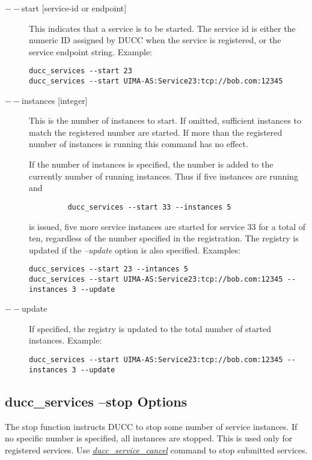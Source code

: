        \begin{description}
       \item[$--$start {[service-id or endpoint]}] This indicates that a service is to be started. The service id
         is either the numeric ID assigned by DUCC when the service is registered, or the service
         endpoint string.  Example:
\begin{verbatim}
ducc_services --start 23 
ducc_services --start UIMA-AS:Service23:tcp://bob.com:12345 
\end{verbatim}
         
       \item[$--$instances {[integer]}] This is the number of instances to start. If omitted, sufficient
         instances to match the registered number are started. If more than the registered number of
         instances is running this command has no effect.

         If the number of instances is specified, the number is added
         to the currently number of running instances. Thus if five instances are running and
\begin{verbatim}
         ducc_services --start 33 --instances 5
\end{verbatim}
         is issued, five more service instances are started for service 33 for a total of ten,
         regardless of the number specified in the registration. The registry is updated if the
         {\em --update} option is also specified. Examples:
\begin{verbatim}
ducc_services --start 23 --intances 5 
ducc_services --start UIMA-AS:Service23:tcp://bob.com:12345 --instances 3 --update 
\end{verbatim}

       \item[$--$update]If specified, the registry is updated to the total number of started
         instances.  Example:
\begin{verbatim}
ducc_services --start UIMA-AS:Service23:tcp://bob.com:12345 --instances 3 --update 
\end{verbatim}
       \end{description}

    \subsection{ducc\_services --stop Options}
    The stop function instructs DUCC to stop some number of service instances. If no specific number
    is specified, all instances are stopped. This is used only for registered services. Use
    \hyperref[sec:cli.service-cancel]{{\em ducc\_service\_cancel}} command to stop submitted services.

